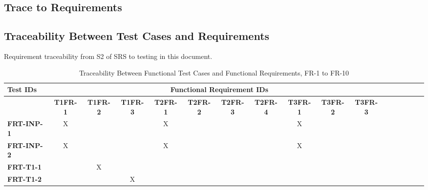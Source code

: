 \documentclass[12pt, titlepage]{article}
\begin{document}
\begin{landscape}
\section{Trace to Requirements}
		\subsection{Traceability Between Test Cases and Requirements}

		Requirement traceability from S2 of SRS to testing in this document.

		\begin{longtable}{|l|cccccccccccccccc|}
			\caption{Traceability Between Functional Test Cases and Functional Requirements, FR-1 to FR-10}                                                                                                                                                                                                                           \\
			\hline
			\textbf{Test IDs}   & \multicolumn{11}{c|}{\textbf{Functional Requirement IDs}}                                                                                                                                                                                                                                         \\
			\hline
			~                   & \textbf{T1FR-1}                                              & \textbf{T1FR-2} & \textbf{T1FR-3} & \textbf{T2FR-1} & \textbf{T2FR-2} & \textbf{T2FR-3} & \textbf{T2FR-4} & \textbf{T3FR-1} & \textbf{T3FR-2} & \textbf{T3FR-3}  \\
			\hline
   		\textbf{FRT-INP-1}  & X                                                         & ~            & ~            & X            & ~            & ~            & ~            & X            & ~            & ~             \\
        	\textbf{FRT-INP-2}  & X                                                         & ~            & ~            & X            & ~            & ~            & ~            & X            & ~            & ~             \\
			\textbf{FRT-T1-1}  & ~                                                         & X            & ~            & ~            & ~            & ~            & ~            & ~            & ~            & ~             \\
      	\textbf{FRT-T1-2}  & ~                                                         & ~            & X            & ~            & ~            & ~            & ~            & ~            & ~            & ~             \\

\end{longtable}
\end{landscape}
\end{document}
